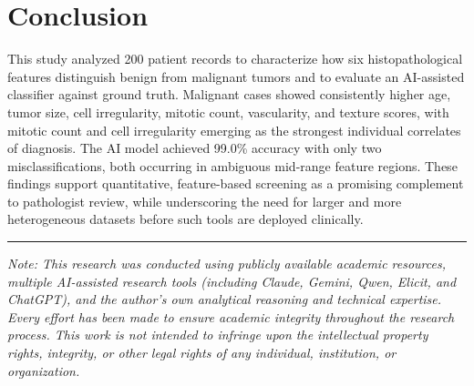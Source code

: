 \documentclass[10pt,twocolumn]{article}
\begin{document}
\section{Conclusion}
This study analyzed 200 patient records to characterize how six histopathological features distinguish benign from malignant tumors and to evaluate an AI-assisted classifier against ground truth. Malignant cases showed consistently higher age, tumor size, cell irregularity, mitotic count, vascularity, and texture scores, with mitotic count and cell irregularity emerging as the strongest individual correlates of diagnosis. The AI model achieved 99.0\% accuracy with only two misclassifications, both occurring in ambiguous mid-range feature regions. These findings support quantitative, feature-based screening as a promising complement to pathologist review, while underscoring the need for larger and more heterogeneous datasets before such tools are deployed clinically.




\vspace{6pt}
\noindent\rule{\linewidth}{0.4pt}
\footnotesize\textit{Note: This research was conducted using publicly available academic resources, multiple AI-assisted research tools (including Claude, Gemini, Qwen, Elicit, and ChatGPT), and the author's own analytical reasoning and technical expertise. Every effort has been made to ensure academic integrity throughout the research process. This work is not intended to infringe upon the intellectual property rights, integrity, or other legal rights of any individual, institution, or organization.}
\end{document}
